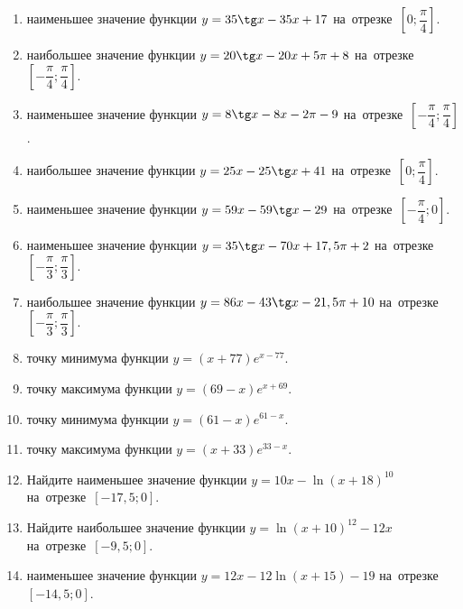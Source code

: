 \documentclass[a4paper,10pt]{article}
\begin{document}
\begin{enumerate}
\item {} наименьшее значение функции $y = 35\tg x-35x+17$ на~отрезке~$\left[0;\dfrac{\pi }{4}\right]$.

\item {} наибольшее значение функции $y=20\tg x-20x+5\pi +8$ на~отрезке~$\left[-\dfrac{\pi }{4};\dfrac{\pi }{4}\right]$.

\item {} наименьшее значение функции $y=8\tg x-8x-2\pi -9$ на~отрезке~$\left[-\dfrac{\pi }{4};\dfrac{\pi }{4}\right]$.

\item {} наибольшее значение функции $y = 25x-25\tg x +41$ на~отрезке~$\left[0;\dfrac{\pi }{4}\right]$.

\item {} наименьшее значение функции $y = 59x-59\tg x -29$ на~отрезке~$\left[-\dfrac{\pi }{4};0\right]$.

\item {} наименьшее значение функции $y = 35\tg x-70x+17,5 \pi +2$ на~отрезке~$\left[-\dfrac{\pi }{3};\dfrac{\pi }{3}\right]$.

\item {} наибольшее значение функции $y = 86x-43\tg x-21,5\pi +10$ на~отрезке~$\left[-\dfrac{\pi }{3};\dfrac{\pi }{3}\right]$.

\item {} точку минимума функции $y = \left(x+77\right)e^{x-77}$.

\item {} точку максимума функции $y = \left(69-x\right)e^{x+69}$.

\item {} точку минимума функции $y = \left(61-x\right)e^{61-x}$.

\item {} точку максимума функции $y = \left(x+33\right)e^{33-x}$.

\item Найдите наименьшее значение функции $y = 10x-\ln \left(x+18\right)^{10}$ на~отрезке~$\left[-17,5;0\right]$.

\item Найдите наибольшее значение функции $y = \ln \left(x+10\right)^{12}-12x$ на~отрезке~$\left[-9,5;0\right]$.

\item {} наименьшее значение функции $y = 12x-12\ln \left(x+15\right) -19$ на~отрезке~$\left[-14,5;0\right]$.


\end{enumerate}
\end{document}

